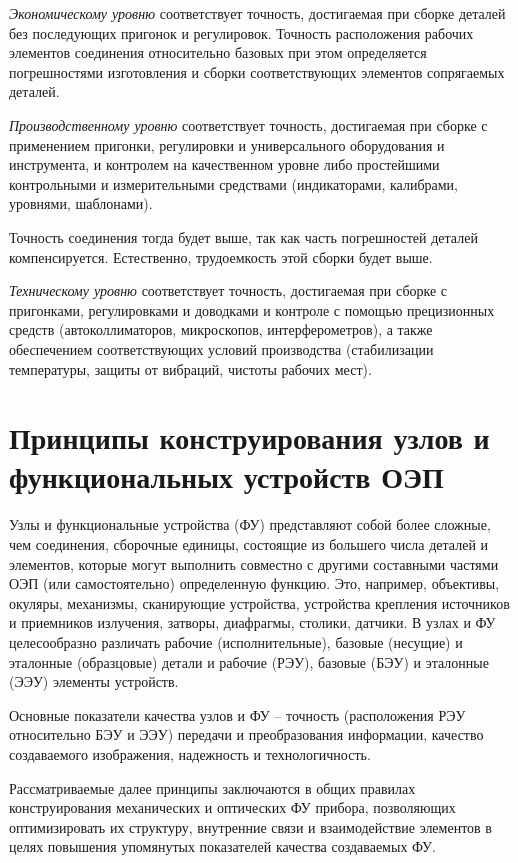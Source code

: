 \textit{Экономическому уровню} соответствует точность, достигаемая при сборке деталей без последующих пригонок и регулировок. Точность расположения рабочих элементов соединения относительно базовых при этом определяется погрешностями изготовления и сборки соответствующих элементов сопрягаемых деталей.

\textit{Производственному уровню} соответствует точность, достигаемая при сборке с применением пригонки, регулировки и универсального оборудования и инструмента, и контролем на качественном уровне либо простейшими контрольными и измерительными средствами (индикаторами, калибрами, уровнями, шаблонами).

Точность соединения тогда будет выше, так как часть погрешностей деталей компенсируется. Естественно, трудоемкость этой сборки будет выше.

\textit{Техническому уровню} соответствует точность, достигаемая при сборке с пригонками, регулировками и доводками и контроле с помощью прецизионных средств (автоколлиматоров, микроскопов, интерферометров), а также обеспечением соответствующих условий производства (стабилизации температуры, защиты от вибраций, чистоты рабочих мест).

\section{Принципы конструирования узлов и функциональных устройств ОЭП}

Узлы и функциональные устройства (ФУ) представляют собой более сложные, чем соединения, сборочные единицы, состоящие из большего числа деталей и элементов, которые могут выполнить совместно с другими составными частями ОЭП (или самостоятельно) определенную функцию. Это, например, объективы, окуляры, механизмы, сканирующие устройства, устройства крепления источников и приемников излучения, затворы, диафрагмы, столики, датчики. В узлах и ФУ целесообразно различать рабочие (исполнительные), базовые (несущие) и эталонные (образцовые) детали и рабочие (РЭУ), базовые (БЭУ) и эталонные (ЭЭУ) элементы устройств.

Основные показатели качества узлов и ФУ -- точность (расположения РЭУ относительно БЭУ и ЭЭУ) передачи и преобразования информации, качество создаваемого изображения, надежность и технологичность.

Рассматриваемые далее принципы заключаются в общих правилах конструирования механических и оптических ФУ прибора, позволяющих оптимизировать их структуру, внутренние связи и взаимодействие элементов в целях повышения упомянутых показателей качества создаваемых ФУ.

